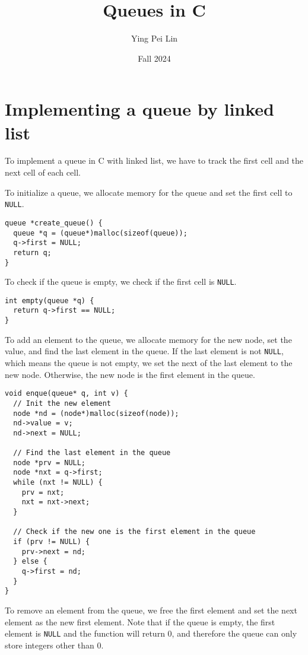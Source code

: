 \documentclass[a4paper,11pt]{article}
\begin{document}
\title{
  \textbf{Queues in C}
}
\author{Ying Pei Lin}
\date{Fall 2024}

\maketitle

\section*{Implementing a queue by linked list}

To implement a queue in C with linked list, we have to track the first cell and the next
cell of each cell. 

To initialize a queue, we allocate memory for the queue and set the first cell to {\tt NULL}.

\begin{verbatim}
queue *create_queue() {
  queue *q = (queue*)malloc(sizeof(queue));
  q->first = NULL;
  return q;
}
\end{verbatim}

To check if the queue is empty, we check if the first cell is {\tt NULL}.

\begin{verbatim}
int empty(queue *q) {
  return q->first == NULL;
}
\end{verbatim}

To add an element to the queue, we allocate memory for the new node, set the value,
and find the last element in the queue. If the last element is not {\tt NULL}, which means
the queue is not empty, we set the next of the last element to the new node. Otherwise,
the new node is the first element in the queue.

\begin{verbatim}
void enque(queue* q, int v) {
  // Init the new element
  node *nd = (node*)malloc(sizeof(node));
  nd->value = v;
  nd->next = NULL;

  // Find the last element in the queue
  node *prv = NULL;
  node *nxt = q->first;
  while (nxt != NULL) {
    prv = nxt;
    nxt = nxt->next;
  }

  // Check if the new one is the first element in the queue
  if (prv != NULL) {
    prv->next = nd;
  } else {
    q->first = nd;
  }
}
\end{verbatim}

To remove an element from the queue, we free the first element and set the 
next element as the new first element. Note that if the queue is empty,
the first element is {\tt NULL} and the function will return 0, and therefore
the queue can only store integers other than 0.
\end{document}
